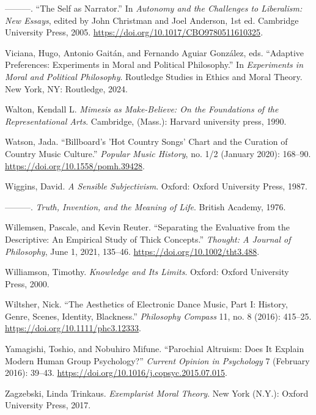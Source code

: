 \documentclass[phdthesis,12pt,final]{wuthesis}
\newlength{\cslhangindent}
\newenvironment{CSLReferences}[2] %
{\begin{list}{}{%
	\setlength{\itemindent}{0pt}
	\setlength{\leftmargin}{0pt}
	\setlength{\parsep}{0pt}
	\ifodd #1
	\setlength{\leftmargin}{\cslhangindent}
	\setlength{\itemindent}{-1\cslhangindent}
	\fi
	\setlength{\itemsep}{#2\baselineskip}}}
{\end{list}}
\theoremstyle{definition}
\theoremstyle{definition}
\theoremstyle{definition}
\theoremstyle{definition}
\theoremstyle{remark}
\begin{document}
\begin{CSLReferences}{1}{0}
---------. {``The {Self} as {Narrator}.''} In \emph{Autonomy and the {Challenges} to {Liberalism}: {New Essays}}, edited by John Christman and Joel Anderson, 1st ed. Cambridge University Press, 2005. \url{https://doi.org/10.1017/CBO9780511610325}.

Viciana, Hugo, Antonio Gaitán, and Fernando Aguiar González, eds. {``Adaptive {Preferences}: {Experiments} in {Moral} and {Political Philosophy}.''} In \emph{Experiments in Moral and Political Philosophy}. Routledge Studies in Ethics and Moral Theory. New York, NY: Routledge, 2024.

Walton, Kendall L. \emph{Mimesis as {Make-Believe}: {On} the {Foundations} of the {Representational Arts}}. Cambridge, (Mass.): Harvard university press, 1990.

Watson, Jada. {``Billboard's '{Hot Country Songs}' Chart and the Curation of Country Music Culture.''} \emph{Popular Music History}, no. 1/2 (January 2020): 168--90. \url{https://doi.org/10.1558/pomh.39428}.

Wiggins, David. \emph{A Sensible Subjectivism}. Oxford: Oxford University Press, 1987.

---------. \emph{Truth, {Invention}, and the {Meaning} of {Life}}. British Academy, 1976.

Willemsen, Pascale, and Kevin Reuter. {``Separating the Evaluative from the Descriptive: {An} Empirical Study of Thick Concepts.''} \emph{Thought: A Journal of Philosophy}, June 1, 2021, 135--46. \url{https://doi.org/10.1002/tht3.488}.

Williamson, Timothy. \emph{Knowledge and {Its Limits}}. Oxford: Oxford University Press, 2000.

Wiltsher, Nick. {``The {Aesthetics} of {Electronic Dance Music}, {Part I}: {History}, {Genre}, {Scenes}, {Identity}, {Blackness}.''} \emph{Philosophy Compass} 11, no. 8 (2016): 415--25. \url{https://doi.org/10.1111/phc3.12333}.

Yamagishi, Toshio, and Nobuhiro Mifune. {``Parochial {Altruism}: {Does It Explain Modern Human Group Psychology}?''} \emph{Current Opinion in Psychology} 7 (February 2016): 39--43. \url{https://doi.org/10.1016/j.copsyc.2015.07.015}.

Zagzebski, Linda Trinkaus. \emph{Exemplarist {Moral Theory}}. New York (N.Y.): Oxford University Press, 2017.

\end{CSLReferences}
\end{document}
